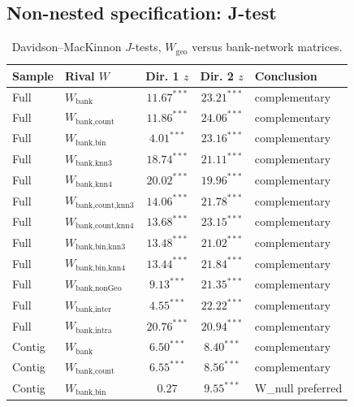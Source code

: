 \clearpage
 
\subsection{Non-nested specification: J-test}
\begin{table}[htbp]
  \centering
  \caption{Davidson--MacKinnon $J$-tests, $W_{\text{geo}}$ versus bank-network matrices.}
  \label{tab:jtest}
  \footnotesize
  \begin{tabular}{llccl}
    \toprule
    Sample & Rival $W$ & Dir. 1 $z$ & Dir. 2 $z$ & Conclusion \\
    \midrule
    Full & $W_{\text{bank}}$ & $11.67^{***}$ & $23.21^{***}$ & complementary \\
    Full & $W_{\text{bank,count}}$ & $11.86^{***}$ & $24.06^{***}$ & complementary \\
    Full & $W_{\text{bank,bin}}$ & $4.01^{***}$ & $23.16^{***}$ & complementary \\
    Full & $W_{\text{bank,knn3}}$ & $18.74^{***}$ & $21.11^{***}$ & complementary \\
    Full & $W_{\text{bank,knn4}}$ & $20.02^{***}$ & $19.96^{***}$ & complementary \\
    Full & $W_{\text{bank,count,knn3}}$ & $14.06^{***}$ & $21.78^{***}$ & complementary \\
    Full & $W_{\text{bank,count,knn4}}$ & $13.68^{***}$ & $23.15^{***}$ & complementary \\
    Full & $W_{\text{bank,bin,knn3}}$ & $13.48^{***}$ & $21.02^{***}$ & complementary \\
    Full & $W_{\text{bank,bin,knn4}}$ & $13.44^{***}$ & $21.84^{***}$ & complementary \\
    Full & $W_{\text{bank,nonGeo}}$ & $9.13^{***}$ & $21.35^{***}$ & complementary \\
    Full & $W_{\text{bank,inter}}$ & $4.55^{***}$ & $22.22^{***}$ & complementary \\
    Full & $W_{\text{bank,intra}}$ & $20.76^{***}$ & $20.94^{***}$ & complementary \\
    \addlinespace
    Contig & $W_{\text{bank}}$ & $6.50^{***}$ & $8.40^{***}$ & complementary \\
    Contig & $W_{\text{bank,count}}$ & $6.55^{***}$ & $8.56^{***}$ & complementary \\
    Contig & $W_{\text{bank,bin}}$ & $0.27$ & $9.55^{***}$ & W\_null preferred \\

\end{tabular}
\end{table}
